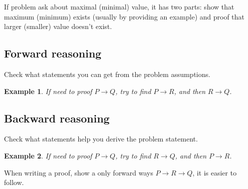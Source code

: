 \documentclass[11pt]{article}
\newtheorem{theorem}{Example}
\begin{document}
If problem ask about maximal (minimal) value, it has two parts: show that maximum (minimum) exists (usually by providing an example) and proof that larger (smaller) value doesn't exist.

\subsection{Forward reasoning}

Check what statements you can get from the problem assumptions.

\begin{theorem}
  If need to proof $P \to Q$, try to find $P \to R$, and then $R \to Q$.
\end{theorem}

\subsection{Backward reasoning}

Check what statements help you derive the problem statement.

\begin{theorem}
  If need to proof $P \to Q$, try to find $R \to Q$, and then $P \to R$.
\end{theorem}

When writing a proof, show a only forward ways $P \to R \to Q$, it is easier to follow.
\end{document}
